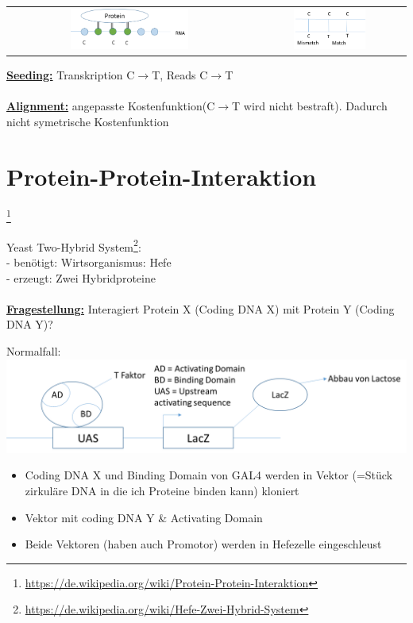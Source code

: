 \begin{tabular}{cc}
\includegraphics[width=0.5\textwidth]{lectures/160429/pix/par_clip1.png} & \includegraphics[width=0.5\textwidth]{lectures/160429/pix/par_clip2.png}
\end{tabular}

\textbf{\underline{Seeding:}} Transkription C$\rightarrow$T, Reads C$\rightarrow$T\\\\
\textbf{\underline{Alignment:}} angepasste Kostenfunktion(C$\rightarrow$T wird nicht bestraft). Dadurch nicht symetrische Kostenfunktion

\newpage

\section{Protein-Protein-Interaktion}\footnote{\url{https://de.wikipedia.org/wiki/Protein-Protein-Interaktion}}

Yeast Two-Hybrid System\footnote{\url{https://de.wikipedia.org/wiki/Hefe-Zwei-Hybrid-System}}:\\
 - benötigt: Wirtsorganismus: Hefe\\
 - erzeugt: Zwei Hybridproteine
\\\\ 
\textbf{\underline{Fragestellung:}} Interagiert Protein X (Coding DNA X) mit Protein Y (Coding DNA Y)?

Normalfall:\\
\includegraphics[width=1\textwidth]{lectures/160429/pix/ppi1.png}
\begin{itemize}
	\item Coding DNA X und Binding Domain von GAL4 werden in Vektor (=Stück zirkuläre DNA in die ich Proteine binden kann) kloniert
	\item Vektor mit coding DNA Y \& Activating Domain
	\item Beide Vektoren (haben auch Promotor) werden in Hefezelle eingeschleust
\end{itemize}


